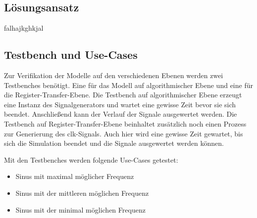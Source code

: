 \subsection{Lösungsansatz}
falhajkghkjal

\subsection{Testbench und Use-Cases}
Zur Verifikation der Modelle auf den verschiedenen Ebenen werden zwei Testbenches 
benötigt. Eine für das Modell auf algorithmischer Ebene und eine für die Register-Transfer-Ebene.
Die Testbench auf algorithmischer Ebene erzeugt eine Instanz des Signalgenerators und
wartet eine gewisse Zeit bevor sie sich beendet. Anschließend kann der Verlauf der
Signale ausgewertet werden.
Die Testbench auf Register-Transfer-Ebene beinhaltet zusätzlich noch einen Prozess
zur Generierung des clk-Signals. Auch hier wird eine gewisse Zeit gewartet, bis sich die
Simulation beendet und die Signale ausgewertet werden können.

\noindent Mit den Testbenches werden folgende Use-Cases getestet:
\begin{itemize}
    \item Sinus mit maximal möglicher Frequenz
    \item Sinus mit der mittleren möglichen Frequenz
    \item Sinus mit der minimal möglichen Frequenz
\end{itemize}
